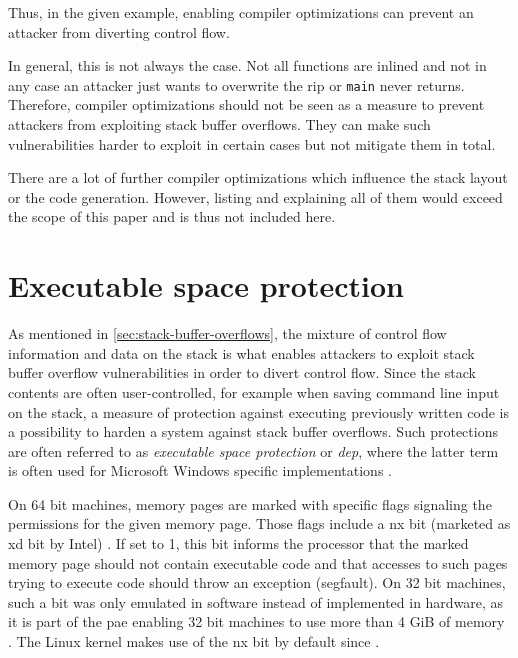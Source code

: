 Thus, in the given example, enabling compiler optimizations can prevent an attacker from diverting control flow.

In general, this is not always the case.
Not all functions are inlined and not in any case an attacker just wants to overwrite the \gls{rip} or \texttt{main} never returns.
Therefore, compiler optimizations should not be seen as a measure to prevent attackers from exploiting stack buffer overflows.
They can make such vulnerabilities harder to exploit in certain cases but not mitigate them in total.

There are a lot of further compiler optimizations which influence the stack layout or the code generation.
However, listing and explaining all of them would exceed the scope of this paper and is thus not included here.

\section{Executable space protection}
\label{sec:executable-space-protection}

As mentioned in \cref{sec:stack-buffer-overflows}, the mixture of control flow information and data on the stack is what enables attackers to exploit stack buffer overflow vulnerabilities in order to divert control flow.
Since the stack contents are often user-controlled, for example when saving command line input on the stack, a measure of protection against executing previously written code is a possibility to harden a system against stack buffer overflows.
Such protections are often referred to as \emph{executable space protection} or \emph{\gls{dep}}, where the latter term is often used for Microsoft Windows specific implementations \cite{Satran2018}.

On 64 bit machines, memory pages are marked with specific flags signaling the permissions for the given memory page.
Those flags include a \gls{nx} bit (marketed as \gls{xd} bit by Intel) \cite[801\psq]{Bryant2011}.
If set to 1, this bit informs the processor that the marked memory page should not contain executable code and that accesses to such pages trying to execute code should throw an exception (\acl{segfault}).
On 32 bit machines, such a bit was only emulated in software instead of implemented in hardware, as it is part of the \gls{pae} enabling 32 bit machines to use more than 4 GiB of memory \cite{Molnar2004}.
The Linux kernel makes use of the \gls{nx} bit by default since \citeyear{Cook2010} \cite{Cook2010}.

